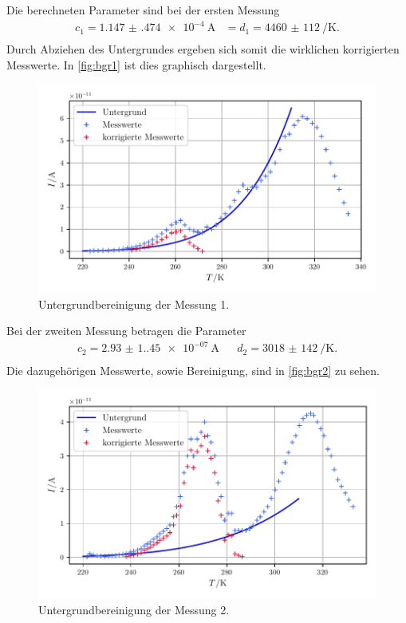 Die berechneten Parameter sind bei der ersten Messung
\begin{align}
    c_1 = \qty{1.147(474)e-4}{\ampere} &= d_1 = \qty{4460(112)}{\per\kelvin}.\\
\end{align}
Durch Abziehen des Untergrundes ergeben sich somit die wirklichen korrigierten Messwerte.
In \autoref{fig:bgr1} ist dies graphisch dargestellt.
\begin{figure}
    \centering
    \includegraphics[width=0.8\linewidth]{scripts/build/plot1_bgr.pdf}
    \caption{Untergrundbereinigung der Messung 1.}%
    \label{fig:bgr1}
\end{figure}

Bei der zweiten Messung betragen die Parameter
\begin{align}
    c_2 = \qty{2.93(1.45)e-07}{\ampere} && d_2 = \qty{3018(142)}{\per\kelvin}.\\
\end{align}
Die dazugehörigen Messwerte, sowie Bereinigung, sind in \autoref{fig:bgr2} zu sehen.
\begin{figure}
    \centering
    \includegraphics[width=0.8\linewidth]{scripts/build/plot2_bgr.pdf}
    \caption{Untergrundbereinigung der Messung 2.}%
    \label{fig:bgr2}
\end{figure}


